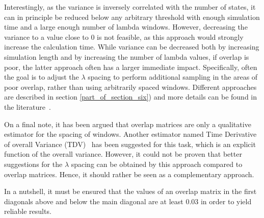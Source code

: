 \documentclass[9pt,bestpractices]{livecoms}
\begin{document}
Interestingly, as the variance is inversely correlated with the number of states\cite{klimovich2015guidelines}, it can in principle be reduced below any arbitrary threshold with enough simulation time and a large enough number of lambda windows. However, decreasing the variance to a value close to 0 is not feasible, as this approach would strongly increase the calculation time. While variance can be decreased both by increasing simulation length and by increasing the number of lambda values, if overlap is poor, the latter approach often has a larger immediate impact.  Specifically, often the goal is to adjust the $\lambda$ spacing to perform additional sampling in the areas of poor overlap, rather than using arbitrarily spaced windows. Different approaches are described in section \ref{part_of_section_six}) and more details can be found in the literature~\cite{dakka2018concurrent, hahn2019alchemical}.

On a final note, it has been argued that overlap matrices are only a qualitative estimator for the spacing of windows. Another estimator named Time Derivative of overall Variance (TDV)~\cite{sun2017barbased} has been suggested for this task, which is an explicit function of the overall variance. However, it could not be proven that better suggestions for the $\lambda$ spacing can be obtained by this approach compared to overlap matrices. Hence, it should rather be seen as a complementary approach. 

In a nutshell, it must be ensured that the values of an overlap matrix in the first diagonals above and below the main diagonal are at least 0.03 in order to yield reliable results. 
\end{document}
